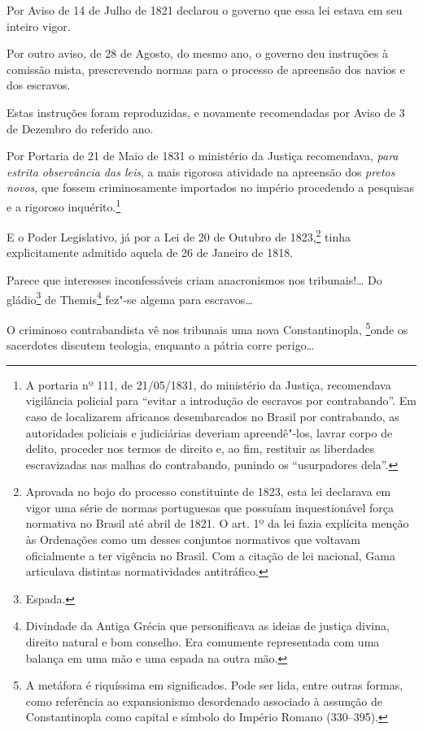 Por Aviso de 14 de Julho de 1821 declarou o governo que essa lei estava
em seu inteiro vigor.

Por outro aviso, de 28 de Agosto, do mesmo ano, o governo deu instruções
à comissão mista, prescrevendo normas para o processo de apreensão dos
navios e dos escravos.

Estas instruções foram reproduzidas, e novamente recomendadas por Aviso
de 3 de Dezembro do referido ano.

Por Portaria de 21 de Maio de 1831 o ministério da Justiça recomendava,
\emph{para estrita observância das leis}, a mais rigorosa atividade na
apreensão dos \emph{pretos novos}, que fossem criminosamente importados
no império procedendo a pesquisas e a rigoroso inquérito.\footnote{A
  portaria nº 111, de 21/05/1831, do ministério da Justiça, recomendava
  vigilância policial para ``evitar a introdução de escravos por
  contrabando''. Em caso de localizarem africanos desembarcados no Brasil
  por contrabando, as autoridades policiais e judiciárias deveriam
  apreendê"-los, lavrar corpo de delito, proceder nos termos de
  direito e, ao fim, restituir as liberdades escravizadas nas malhas
  do contrabando, punindo os ``usurpadores dela''.}

E o Poder Legislativo, já por a Lei de 20 de Outubro de 1823,\footnote{
  Aprovada no bojo do processo constituinte de 1823, esta lei declarava
  em vigor uma série de normas portuguesas que possuíam inquestionável
  força normativa no Brasil até abril de 1821. O art. 1º da lei fazia
  explícita menção às Ordenações como um desses conjuntos normativos que
  voltavam oficialmente a ter vigência no Brasil. Com a citação de lei
  nacional, Gama articulava distintas normatividades
  antitráfico.} tinha
explicitamente admitido aquela de 26 de Janeiro de 1818.

Parece que interesses inconfessáveis criam anacronismos nos
tribunais!\ldots{} Do gládio\footnote{Espada.} de Themis\footnote{
  Divindade da Antiga Grécia que personificava as ideias de justiça
  divina, direito natural e bom conselho. Era comumente representada com
  uma balança em uma mão e uma espada na outra mão.} fez"-se algema para
escravos\ldots{}

O criminoso contrabandista vê nos tribunais uma nova Constantinopla,
\footnote{A metáfora é riquíssima em significados. Pode ser lida,
  entre outras formas, como referência ao expansionismo desordenado
  associado à assunção de Constantinopla como capital e símbolo do
  Império Romano (330--395).}onde os sacerdotes discutem teologia,
enquanto a pátria corre perigo\ldots{}

